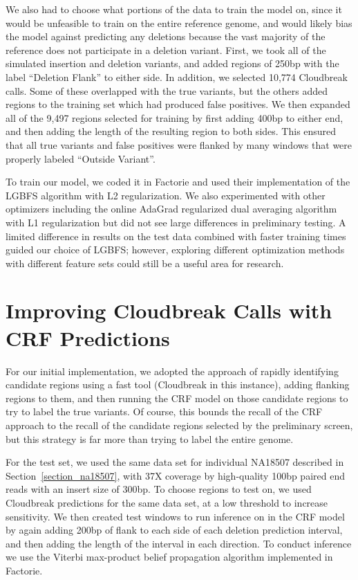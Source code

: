 We also had to choose what portions of the data to train the model on, since it would be unfeasible to train on the entire reference genome, and would likely bias the model against predicting any deletions because the vast majority of the reference does not participate in a deletion variant. First, we took all of the simulated insertion and deletion variants, and added regions of 250bp with the label ``Deletion Flank'' to either side. In addition, we selected 10,774 Cloudbreak calls. Some of these overlapped with the true variants, but the others added regions to the training set which had produced false positives. We then expanded all of the 9,497 regions selected for training by first adding 400bp to either end, and then adding the length of the resulting region to both sides. This ensured that all true variants and false positives were flanked by many windows that were properly labeled ``Outside Variant''.

To train our model, we coded it in Factorie and used their implementation of the LGBFS algorithm with L2 regularization. We also experimented with other optimizers including the online AdaGrad regularized dual averaging algorithm \cite{Duchi:2011:ASM:1953048.2021068} with L1 regularization but did not see large differences in preliminary testing. A limited difference in results on the test data combined with faster training times guided our choice of LGBFS; however, exploring different optimization methods with different feature sets could still be a useful area for research.

\section{Improving Cloudbreak Calls with CRF Predictions}

For our initial implementation, we adopted the approach of rapidly identifying candidate regions using a fast tool (Cloudbreak in this instance), adding flanking regions to them, and then running the CRF model on those candidate regions to try to label the true variants. Of course, this bounds the recall of the CRF approach to the recall of the candidate regions selected by the preliminary screen, but this strategy is far more than trying to label the entire genome.

For the test set, we used the same data set for individual NA18507 described in Section~\ref{section_na18507}, with 37X coverage by high-quality 100bp paired end reads with an insert size of 300bp. To choose regions to test on, we used Cloudbreak predictions for the same data set, at a low threshold to increase sensitivity.  We then created test windows to run inference on in the CRF model by again adding 200bp of flank to each side of each deletion prediction interval, and then adding the length of the interval in each direction. To conduct inference we use the Viterbi max-product belief propagation algorithm implemented in Factorie.

